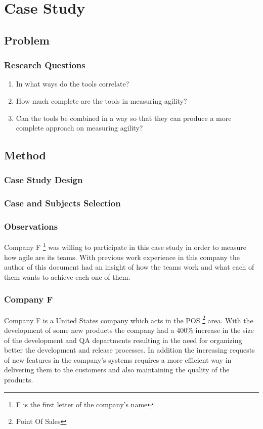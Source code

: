 \chapter{Case Study}
\label{ch:case_study}

\newcommand{\mysubparagraph}[1]{\subparagraph{#1}\mbox{}\\}

\section{Problem}


\subsection{Research Questions}
\begin{enumerate}
\item In what ways do the tools correlate?
\item How much complete are the tools in measuring agility?
\item Can the tools be combined in a way so that they can produce a more complete approach on measuring agility?
\end{enumerate}

\section{Method}

\subsection{Case Study Design}

\subsection{Case and Subjects Selection}

\subsection{Observations}
Company F \footnote{F is the first letter of the company's name} was willing to participate in this case study in order to measure how agile are its teams. With previous work experience in this company the author of this document had an insight of how the teams work and what each of them wants to achieve each one of them. 

\subsection{Company F}
Company F is a United States company which acts in the POS \footnote{Point Of Sales} area. With the development of some new products the company had a 400\% increase in the size of the development and QA departments resulting in the need for organizing better the development and release processes. In addition the increasing requests of new features in the company's systems requires a more efficient way in delivering them to the customers and also maintaining the quality of the products.

